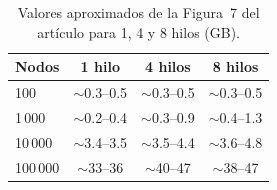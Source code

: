 \documentclass[11pt,a4paper,oneside]{article}
\begin{document}
\begin{table}[H]
\caption{Valores aproximados de la Figura~7 del artículo para 1, 4 y 8 hilos (GB).}
\label{tab:paper7}
\centering
\small
\renewcommand{\arraystretch}{1.15}
\begin{tabular}{lccc}
\toprule
\rowcolor{tablehead}
\textbf{Nodos} & \textbf{1 hilo} & \textbf{4 hilos} & \textbf{8 hilos} \\
\midrule
100     & $\sim$0.3--0.5 & $\sim$0.3--0.5 & $\sim$0.3--0.5 \\
1\,000  & $\sim$0.2--0.4 & $\sim$0.3--0.9 & $\sim$0.4--1.3 \\
10\,000 & $\sim$3.4--3.5 & $\sim$3.5--4.4 & $\sim$3.6--4.8 \\
100\,000 & $\sim$33--36 & $\sim$40--47 & $\sim$38--47 \\
\bottomrule
\end{tabular}
\end{table}
\end{document}
